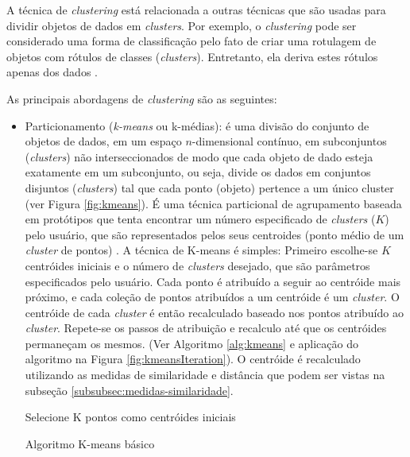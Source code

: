 A técnica de \textit{clustering} está relacionada a outras técnicas que são usadas para dividir objetos de dados em \textit{clusters}. Por exemplo, o \textit{clustering} pode ser considerado uma forma de classificação pelo fato de criar uma rotulagem de objetos com rótulos de classes (\textit{clusters}). Entretanto, ela deriva estes rótulos apenas dos dados \cite{pang2009}.

As principais abordagens de \textit{clustering} são as seguintes:

\begin{itemize}
    \item Particionamento (\textit{k-means} ou k-médias): é uma divisão do conjunto de objetos de dados, em um espaço \textbf{\({n}\)}-dimensional contínuo, em subconjuntos (\textit{clusters}) não interseccionados de modo que cada objeto de dado esteja exatamente em um subconjunto, ou seja, divide os dados em conjuntos disjuntos (\textit{clusters}) tal que cada ponto (objeto) pertence a um único cluster (ver Figura \ref{fig:kmeans}). É uma técnica particional de agrupamento baseada em protótipos que tenta encontrar um número especificado de \textit{clusters} (\textbf{\({K}\)}) pelo usuário, que são representados pelos seus centroides (ponto médio de um \textit{cluster} de pontos) \cite{pang2009}. A técnica de K-means é simples: Primeiro escolhe-se \textbf{\({K}\)} centróides iniciais e o número de \textit{clusters} desejado, que são parâmetros especificados pelo usuário. Cada ponto é atribuído a seguir ao centróide mais próximo, e cada coleção de pontos atribuídos a um centróide é um \textit{cluster}. O centróide de cada \textit{cluster} é então recalculado baseado nos pontos atribuído ao \textit{cluster}. Repete-se os passos de atribuição e recalculo até que os centróides permaneçam os mesmos. (Ver Algoritmo \ref{alg:kmeans} e aplicação do algoritmo na Figura \ref{fig:kmeansIteration}). O centróide é recalculado utilizando as medidas de similaridade e distância que podem ser vistas na subseção \ref{subsubsec:medidas-similaridade}.
    
    \begin{algorithm}[!htb]
        \SetAlgoLined
        Selecione K pontos como centróides iniciais\;
    \caption{Algoritmo K-means básico}
    \label{alg:kmeans}
    \end{algorithm}
        

\end{itemize}
